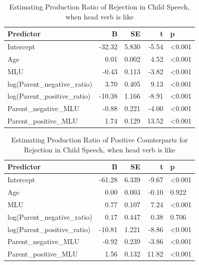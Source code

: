 \documentclass[
  english,
  man,floatsintext]{apa6}
\begin{document}
\begin{table}

\caption{\label{tab:unnamed-chunk-1}Estimating Production Ratio of Rejection in Child Speech, when head verb is like}
\centering
\begin{tabular}[t]{l|r|r|r|l}
\hline
Predictor & B & SE & t & p\\
\hline
Intercept & -32.32 & 5.830 & -5.54 & <0.001\\
\hline
Age & 0.01 & 0.002 & 4.52 & <0.001\\
\hline
MLU & -0.43 & 0.113 & -3.82 & <0.001\\
\hline
log(Parent\_negative\_ratio) & 3.70 & 0.405 & 9.13 & <0.001\\
\hline
log(Parent\_positive\_ratio) & -10.38 & 1.166 & -8.91 & <0.001\\
\hline
Parent\_negative\_MLU & -0.88 & 0.221 & -4.00 & <0.001\\
\hline
Parent\_positive\_MLU & 1.74 & 0.129 & 13.52 & <0.001\\
\hline
\end{tabular}
\end{table}

\begin{table}

\caption{\label{tab:unnamed-chunk-1}Estimating Production Ratio of Positive Counterparts for Rejection in Child Speech, when head verb is like}
\centering
\begin{tabular}[t]{l|r|r|r|l}
\hline
Predictor & B & SE & t & p\\
\hline
Intercept & -61.28 & 6.339 & -9.67 & <0.001\\
\hline
Age & 0.00 & 0.003 & -0.10 & 0.922\\
\hline
MLU & 0.77 & 0.107 & 7.24 & <0.001\\
\hline
log(Parent\_negative\_ratio) & 0.17 & 0.447 & 0.38 & 0.706\\
\hline
log(Parent\_positive\_ratio) & -10.81 & 1.221 & -8.86 & <0.001\\
\hline
Parent\_negative\_MLU & -0.92 & 0.239 & -3.86 & <0.001\\
\hline
Parent\_positive\_MLU & 1.56 & 0.132 & 11.82 & <0.001\\
\hline
\end{tabular}
\end{table}

\clearpage
\end{document}
